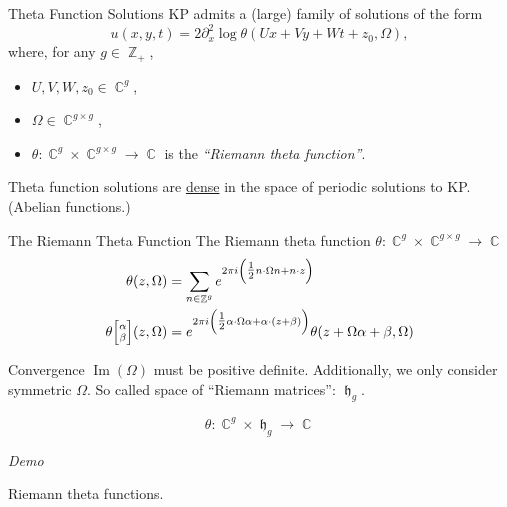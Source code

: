 \documentclass{beamer}
\DeclareMathOperator{\ZZ}{\mathbb{Z}}
\DeclareMathOperator{\CC}{\mathbb{C}}
\DeclareMathOperator{\hh}{\mathfrak{h}}
\DeclareMathOperator{\im}{\text{Im}}
\newcommand{\thetachar}[2] {\theta {\scriptsize \begin{bmatrix}#1\\#2\end{bmatrix}}}
\begin{document}
\begin{frame}{Theta Function Solutions}{}
  KP admits a (large) family of solutions of the form
  \[
  u(x,y,t) = 2 \partial_x^2 \log
  \theta(Ux + Vy + Wt + z_0, \Omega),
  \]
  where, for any $g \in \ZZ_+$,
  \begin{itemize}
    \item $U,V,W,z_0 \in \CC^g$,
    \item $\Omega \in \CC^{g \times g}$,
    \item $\theta : \CC^g \times \CC^{g \times g} \to \CC$
      is the {\it``Riemann theta function''}.
  \end{itemize}

  \vspace{16pt}

  Theta function solutions are \underline{dense} in the space of
  periodic solutions to KP. (Abelian functions.)
\end{frame}



\begin{frame}{The Riemann Theta Function}
  The Riemann theta function $\theta:\CC^g \times \CC^{g \times g} \to
  \CC$
  \begin{align*}
  \theta(z,\Omega)
  &=
  \sum_{n \in \ZZ^g}
  e^{
    2 \pi i
    \left( \tfrac{1}{2} n \cdot \Omega n + n \cdot z \right)
  } \\
  \thetachar{\alpha}{\beta}(z,\Omega)
  &=
  e^{2 \pi i \left( \tfrac{1}{2} \alpha \cdot \Omega \alpha + \alpha
    \cdot (z + \beta) \right)}
  \theta(z + \Omega \alpha + \beta, \Omega)
  \end{align*}

  \begin{block}{Convergence}
    $\im(\Omega)$ must be positive definite. Additionally, we only
    consider symmetric $\Omega$. So called space of ``Riemann
    matrices'': $\hh_g$.
  \end{block}
  \[
    \theta:\CC^g \times \hh_g \to \CC
  \]
\end{frame}



\begin{frame}{\phantom{Demo}}{}
  \begin{center}
    {\huge \it Demo}

    \vspace{1cm}

    Riemann theta functions.
  \end{center}
\end{frame}
\end{document}
